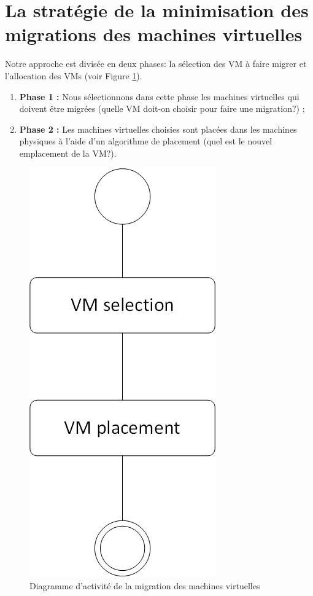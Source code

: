 \section{La stratégie de la minimisation des migrations des machines virtuelles}
\begin{onehalfspace}
Notre approche est divisée en deux phases: la sélection des VM à faire migrer  et l'allocation des VMs (voir Figure \ref{DiAMM}).

\begin{enumerate}
\item \textbf{Phase 1 : }Nous sélectionnons dans cette phase les machines virtuelles qui doivent être migrées (quelle VM doit-on choisir pour  faire une migration?) ;
\item \textbf{Phase 2 : }Les machines virtuelles choisies sont placées dans  les machines physiques à l’aide d’un algorithme de placement (quel  est le nouvel emplacement de la VM?).
\end{enumerate} 
\end{onehalfspace}
\clearpage
\begin{figure}[!h]
\begin{center}
\includegraphics[scale=0.5]{figures/6.png} 
\end{center}
\caption{Diagramme d'activité de la migration des machines virtuelles}
\label{DiAMM}
\end{figure}



